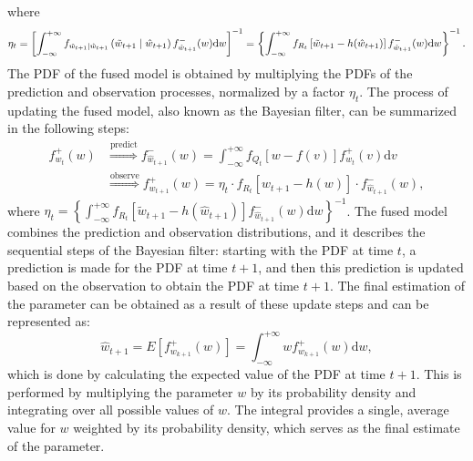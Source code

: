 where 
\begin{equation}
    \small
   \eta_t=\left[\int_{-\infty}^{+\infty} f_{\tilde{w}_{t+1} \mid \hat{w}_{t+1}}\left(\tilde{w}_{t+1} \mid \hat{w}_{t+1}\right) f_{\hat{w}_{t+1}}^{-}(w) \mathrm{d} w\right]^{-1}=\left\{\int_{-\infty}^{+\infty} f_{R_t}\left[\tilde{w}_{t+1}-h(\hat{w}_{t+1})\right] f_{\hat{w}_{t+1}}^{-}(w) \mathrm{d} w\right\}^{-1}.
\end{equation}
The PDF of the fused model is obtained by multiplying the PDFs of the prediction and observation processes, normalized by a factor $\eta_t$.
The process of updating the fused model, also known as the Bayesian filter, can be summarized in the following steps:
\begin{equation}
   \begin{aligned}
   f_{w_t}^{+}(w) &\stackrel{\text {predict}}{\Longrightarrow} f_{\hat{w}_{t+1}}^{-}(w)=\int_{-\infty}^{+\infty} f_{Q_t}[w-f(v)] f_{w_t}^{+}(v) \mathrm{d} v\\ &\stackrel{\text {observe}}{\Longrightarrow} f_{w_{t+1}}^{+}(w)=\eta_t \cdot f_{R_t}\left[w_{t+1}-h(w)\right]
   \cdot f_{\hat{w}_{t+1}}^{-}(w),
   \end{aligned}
   \end{equation}
where $\eta_t=\left\{\int_{-\infty}^{+\infty} f_{R_t}\left[\tilde{w}_{t+1}-h(\hat{w}_{t+1})\right] f_{\hat{w}_{t+1}}^{-}(w) \mathrm{d} w\right\}^{-1}$. The fused model combines the prediction and observation distributions, and it describes the sequential steps of the Bayesian filter: starting with the PDF at time $t$, a prediction is made for the PDF at time $t+1$, and then this prediction is updated based on the observation to obtain the PDF at time $t+1$. The final estimation of the parameter can be obtained as a result of these update steps and can be represented as:
\begin{equation}
   \hat{w}_{t+1}=E\left[f_{w_{k+1}}^{+}(w)\right]=\int_{-\infty}^{+\infty} w f_{w_{k+1}}^{+}(w) \mathrm{d} w,
   \end{equation}
which is done by calculating the expected value of the PDF at time $t+1$. This is performed by multiplying the parameter $w$ by its probability density and integrating over all possible values of $w$. The integral provides a single, average value for $w$ weighted by its probability density, which serves as the final estimate of the parameter.

\subsubsection{\fedeve}\label{sec:fedeve}

